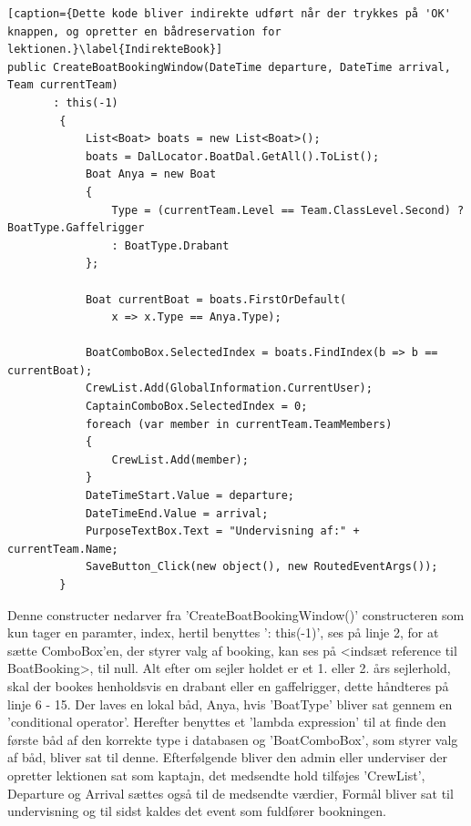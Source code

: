 \begin{lstlisting}[caption={Dette kode bliver indirekte udført når der trykkes på 'OK' knappen, og opretter en bådreservation for lektionen.}\label{IndirekteBook}]
public CreateBoatBookingWindow(DateTime departure, DateTime arrival, Team currentTeam) 
	   : this(-1)
        {
            List<Boat> boats = new List<Boat>();
            boats = DalLocator.BoatDal.GetAll().ToList();
            Boat Anya = new Boat
            {
                Type = (currentTeam.Level == Team.ClassLevel.Second) ? BoatType.Gaffelrigger 
                : BoatType.Drabant
            };

            Boat currentBoat = boats.FirstOrDefault(
                x => x.Type == Anya.Type);

            BoatComboBox.SelectedIndex = boats.FindIndex(b => b == currentBoat);
            CrewList.Add(GlobalInformation.CurrentUser);
            CaptainComboBox.SelectedIndex = 0;
            foreach (var member in currentTeam.TeamMembers)
            {
                CrewList.Add(member);
            }
            DateTimeStart.Value = departure;
            DateTimeEnd.Value = arrival;
            PurposeTextBox.Text = "Undervisning af:" + currentTeam.Name;
            SaveButton_Click(new object(), new RoutedEventArgs());
        }
\end{lstlisting}
Denne constructer nedarver fra 'CreateBoatBookingWindow()' constructeren som kun tager en paramter, index, hertil benyttes ': this(-1)', ses på linje 2, for at sætte ComboBox'en, der styrer valg af booking, kan ses på <indsæt reference til BoatBooking>, til null.
Alt efter om sejler holdet er et 1. eller 2. års sejlerhold, skal der bookes henholdsvis en drabant eller en gaffelrigger, dette håndteres på linje 6 - 15. Der laves en lokal båd, Anya, hvis 'BoatType' bliver sat gennem en 'conditional operator'.
Herefter benyttes et 'lambda expression' til at finde den første båd af den korrekte type i databasen og 'BoatComboBox', som styrer valg af båd, bliver sat til denne.
Efterfølgende bliver den admin eller underviser der opretter lektionen sat som kaptajn, det medsendte hold tilføjes 'CrewList', Departure og Arrival sættes også til de medsendte værdier, Formål bliver sat til undervisning og til sidst kaldes det event som fuldfører bookningen.

